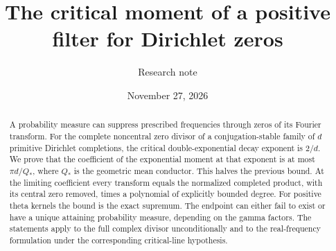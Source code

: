 \documentclass[11pt]{article}
\title{The critical moment of a positive filter for Dirichlet zeros}
\author{Research note}\date{November 27, 2026}
\begin{document}
\maketitle
\begin{abstract}
A probability measure can suppress prescribed frequencies through zeros of its Fourier transform. For the complete noncentral zero divisor of a conjugation-stable family of $d$ primitive Dirichlet completions, the critical double-exponential decay exponent is $2/d$. We prove that the coefficient of the exponential moment at that exponent is at most $\pi d/Q_*$, where $Q_*$ is the geometric mean conductor. This halves the previous bound. At the limiting coefficient every transform equals the normalized completed product, with its central zero removed, times a polynomial of explicitly bounded degree. For positive theta kernels the bound is the exact supremum. The endpoint can either fail to exist or have a unique attaining probability measure, depending on the gamma factors. The statements apply to the full complex divisor unconditionally and to the real-frequency formulation under the corresponding critical-line hypothesis.
\end{abstract}
\end{document}
